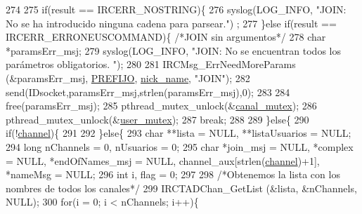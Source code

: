 \begin{DoxyCode}
{274 
275                 \textcolor{keywordflow}{if}(result == IRCERR\_NOSTRING)\{
276                                 syslog(LOG\_INFO, \textcolor{stringliteral}{"JOIN: No se ha introducido ninguna cadena para parsear."})
      ;
277                         \}\textcolor{keywordflow}{else} \textcolor{keywordflow}{if}(result == IRCERR\_ERRONEUSCOMMAND)\{ \textcolor{comment}{/*JOIN sin argumentos*/}
278                                 \textcolor{keywordtype}{char} *paramsErr\_msj;
279                                 syslog(LOG\_INFO, \textcolor{stringliteral}{"JOIN: No se encuentran todos los parámetros obligatorios.
      "});
280 
281                                 IRCMsg\_ErrNeedMoreParams (&paramsErr\_msj, 
      \hyperlink{_g-2361-06-_p1-_server_8h_a78c658ff923693099f7b621e7c351129}{PREFIJO}, \hyperlink{_g-2361-06-_p1-_server_8c_aabbf66718cda228b924a4a9441eadf62}{nick\_name}, \textcolor{stringliteral}{"JOIN"});
282                                 send(IDsocket,paramsErr\_msj,strlen(paramsErr\_msj),0);
283 
284                                 free(paramsErr\_msj);
285                                 pthread\_mutex\_unlock(&\hyperlink{_g-2361-06-_p1-_server_8c_ab86a544a49de18195048bac54dd3ac3e}{canal\_mutex});
286                                 pthread\_mutex\_unlock(&\hyperlink{_g-2361-06-_p1-_server_8c_a5dedd07a1144d2ab70b74a8e64b6a7c0}{user\_mutex});
287                                 \textcolor{keywordflow}{break};
288 
289                         \}\textcolor{keywordflow}{else}\{                          
290                                 \textcolor{keywordflow}{if}(!\hyperlink{_g-2361-06-_p1-_server_8c_a842ca2f026578e5c479c095ff3335969}{channel})\{
291 
292                                 \}\textcolor{keywordflow}{else}\{
293                                         \textcolor{keywordtype}{char} **lista = NULL, **listaUsuarios = NULL;
294                                         \textcolor{keywordtype}{long} nChannels = 0, nUsuarios = 0;
295                                         \textcolor{keywordtype}{char} *join\_msj = NULL, *complex = NULL, *endOfNames\_msj = NULL, 
      channel\_aux[strlen(\hyperlink{_g-2361-06-_p1-_server_8c_a842ca2f026578e5c479c095ff3335969}{channel})+1], *nameMsg = NULL;
296                                         \textcolor{keywordtype}{int} i, flag = 0;
297 
298                                         \textcolor{comment}{/*Obtenemos la lista con los nombres de todos los canales*/}
299                                         IRCTADChan\_GetList (&lista, &nChannels, NULL);
300                                         \textcolor{keywordflow}{for}(i = 0; i < nChannels; i++)\{
}
\end{DoxyCode}

